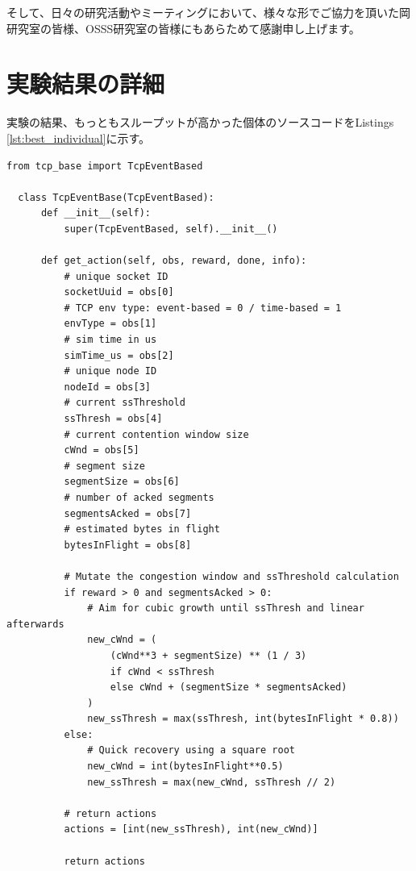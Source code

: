 \documentclass[a4paper,11pt]{jreport}
\begin{document}
そして、日々の研究活動やミーティングにおいて、様々な形でご協力を頂いた岡研究室の皆様、OSSS研究室の皆様にもあらためて感謝申し上げます。

\newpage

\renewcommand{\bibname}{参考文献}




\appendix
\chapter{実験結果の詳細}
\label{appendix:experiment-result}
実験の結果、もっともスループットが高かった個体のソースコードをListings \ref{lst:best_individual}に示す。
\begin{lstlisting}[caption=最もスループットが高かった個体のソースコード,label=lst:best_individual]
  from tcp_base import TcpEventBased

  class TcpEventBase(TcpEventBased):
      def __init__(self):
          super(TcpEventBased, self).__init__()

      def get_action(self, obs, reward, done, info):
          # unique socket ID
          socketUuid = obs[0]
          # TCP env type: event-based = 0 / time-based = 1
          envType = obs[1]
          # sim time in us
          simTime_us = obs[2]
          # unique node ID
          nodeId = obs[3]
          # current ssThreshold
          ssThresh = obs[4]
          # current contention window size
          cWnd = obs[5]
          # segment size
          segmentSize = obs[6]
          # number of acked segments
          segmentsAcked = obs[7]
          # estimated bytes in flight
          bytesInFlight = obs[8]

          # Mutate the congestion window and ssThreshold calculation
          if reward > 0 and segmentsAcked > 0:
              # Aim for cubic growth until ssThresh and linear afterwards
              new_cWnd = (
                  (cWnd**3 + segmentSize) ** (1 / 3)
                  if cWnd < ssThresh
                  else cWnd + (segmentSize * segmentsAcked)
              )
              new_ssThresh = max(ssThresh, int(bytesInFlight * 0.8))
          else:
              # Quick recovery using a square root
              new_cWnd = int(bytesInFlight**0.5)
              new_ssThresh = max(new_cWnd, ssThresh // 2)

          # return actions
          actions = [int(new_ssThresh), int(new_cWnd)]

          return actions
  \end{lstlisting}
\end{document}
